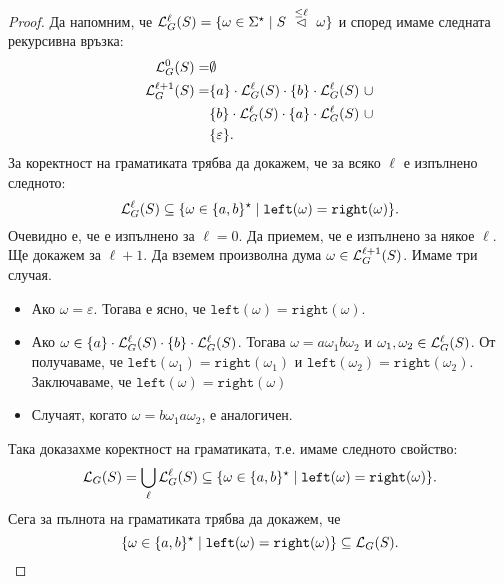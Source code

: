 \begin{proof}
  Да напомним, че $\mathcal{L}^\ell_G(S) = \{\omega \in \Sigma^\star \mid S ~\stackrel{{\leq \ell}}{\lhd}~ \omega\}$
  и според  имаме следната рекурсивна връзка:
  \begin{align*}
    \mathcal{L}^0_G(S) = & \emptyset\\
    \mathcal{L}^{\ell+1}_G(S) = & \{a\} \cdot \mathcal{L}^\ell_G(S) \cdot \{b\} \cdot \mathcal{L}^\ell_G(S)\ \cup\\
                & \{b\} \cdot \mathcal{L}^\ell_G(S) \cdot \{a\} \cdot \mathcal{L}^\ell_G(S)\ \cup\\
                & \{\varepsilon\}.
  \end{align*}
  За коректност на граматиката трябва да докажем, че за всяко $\ell$ е изпълнено следното:
  \begin{equation}
    \label{eq:equal-correctness}
    \mathcal{L}^\ell_G(S) \subseteq \{\omega \in \{a,b\}^\star \mid \texttt{left}(\omega) = \texttt{right}(\omega)\}.
  \end{equation}
  Очевидно е, че  е изпълнено за $\ell = 0$.
  Да приемем, че  е изпълнено за някое $\ell$.
  Ще докажем  за $\ell+1$.
  Да вземем произволна дума $\omega \in \mathcal{L}^{\ell+1}_G(S)$. Имаме три случая.
  \begin{itemize}
  \item
    Ако $\omega = \varepsilon$. Тогава е ясно, че $\texttt{left}(\omega) = \texttt{right}(\omega)$.
  \item
    Ако $\omega \in \{a\} \cdot \mathcal{L}^\ell_G(S) \cdot \{b\} \cdot \mathcal{L}^\ell_G(S)$.
    Тогава $\omega = a \omega_1 b \omega_2$ и $\omega_1, \omega_2 \in \mathcal{L}^\ell_G(S)$.
    От \IndHyp получаваме, че $\texttt{left}(\omega_1) = \texttt{right}(\omega_1)$ и $\texttt{left}(\omega_2) = \texttt{right}(\omega_2)$.
    Заключаваме, че $\texttt{left}(\omega) = \texttt{right}(\omega)$
  \item
    Случаят, когато $\omega = b \omega_1 a \omega_2$, е аналогичен.
  \end{itemize}
  Така доказахме коректност на граматиката, т.е. имаме следното свойство:
  \[\mathcal{L}_G(S) = \bigcup_\ell \mathcal{L}^\ell_G(S) \subseteq \{\omega \in \{a,b\}^\star \mid \texttt{left}(\omega) = \texttt{right}(\omega)\}.\]
  Сега за пълнота на граматиката трябва да докажем, че
  \begin{equation}
    \label{eq:equal-completeness}
    \{\omega \in \{a,b\}^\star \mid \texttt{left}(\omega) = \texttt{right}(\omega)\} \subseteq \mathcal{L}_G(S).
  \end{equation}

\end{proof}
